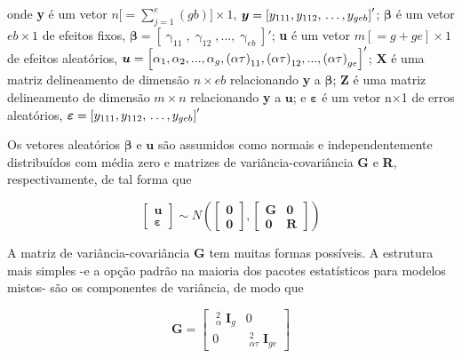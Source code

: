 \documentclass[
]{book}
\begin{document}
onde \textbf{y} é um vetor \(n[ = \sum\nolimits_{j = 1}^e {(gb)]} \times 1\), \({\boldsymbol{y}} = {\rm{ }}{\left[ {{y_{111}},{\rm{ }}{y_{112}},{\rm{ }} \ldots ,{\rm{ }}{y_{geb}}} \right]^\prime }\); \(\boldsymbol{\beta}\) é um vetor \(eb \times 1\) de efeitos fixos, \({\boldsymbol{\beta }} = [\mathop \gamma \nolimits_{11} ,\mathop \gamma \nolimits_{12} ,...,\mathop \gamma \nolimits_{eb} ]'\); \textbf{u} é um vetor \(m[ = g + ge] \times 1\) de efeitos aleatórios, \({\boldsymbol{u}} = {\rm{ }}{\left[ {{\alpha _1},{\alpha _2},...,{\alpha _g},\mathop {(\alpha \tau )}\nolimits_{11} ,\mathop {(\alpha \tau )}\nolimits_{12} ,...,\mathop {(\alpha \tau )}\nolimits_{ge} } \right]^\prime }\); \textbf{X} é uma matriz delineamento de dimensão \(n \times eb\) relacionando \textbf{y} a \({\boldsymbol{\beta }}\); \textbf{Z} é uma matriz delineamento de dimensão \(m\times n\) relacionando \textbf{y} a \(\boldsymbol{u}\); e \({\boldsymbol{\varepsilon }}\) é um vetor n×1 de erros aleatórios, \({\boldsymbol{\varepsilon }} = {\rm{ }}{\left[ {{y_{111}},{\rm{ }}{y_{112}},{\rm{ }} \ldots ,{\rm{ }}{y_{geb}}} \right]^\prime }\)

Os vetores aleatórios \({\boldsymbol{\beta }}\) e \(\boldsymbol{u}\) são assumidos como normais e independentemente distribuídos com média zero e matrizes de variância-covariância \textbf{G} e \textbf{R}, respectivamente, de tal forma que

\[
\left[ \begin{array}{l}{\boldsymbol{u}}\\{\boldsymbol{\varepsilon }}\end{array} \right]\sim N\left( {\left[ \begin{array}{l}{\boldsymbol{0}}\\{\boldsymbol{0}}\end{array} \right]{\boldsymbol{,}}\left[ {\begin{array}{*{20}{c}}{\boldsymbol{G}}&{\boldsymbol{0}}\\{\boldsymbol{0}}&{\boldsymbol{R}}\end{array}} \right]} \right)
\]

A matriz de variância-covariância \textbf{G} tem muitas formas possíveis. A estrutura mais simples -e a opção padrão na maioria dos pacotes estatísticos para modelos mistos- são os componentes de variância, de modo que

\[
{\boldsymbol{G}} = \left[ {\begin{array}{*{20}{c}}{\mathop {\hat \sigma }\nolimits_\alpha ^2 {{\boldsymbol{I}}_g}}&0\\0&{\mathop {\hat \sigma }\nolimits_{\alpha \tau }^2 {{\boldsymbol{I}}_{ge}}}\end{array}} \right]
\]
\end{document}
